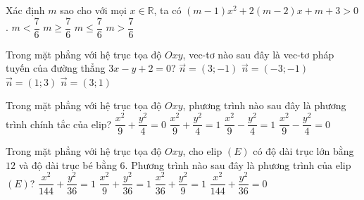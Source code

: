 \begin{ex}%
	Xác định $m$ sao cho với mọi $x\in\mathbb{R}$, ta có $(m-1)x^2+2(m-2)x+m+3>0$.
	\choice
	{$m<\dfrac{7}{6}$}
	{$m\ge\dfrac{7}{6}$}
	{$m\le\dfrac{7}{6}$}
	{\True $m>\dfrac{7}{6}$}
\end{ex}
\begin{ex}%
	Trong mặt phẳng với hệ trục tọa độ $Oxy$, vec-tơ nào sau đây là vec-tơ pháp tuyến của đường thẳng $3x-y+2=0$?
	\choice
	{\True $\overrightarrow{n}=(3;-1)$}
	{$\overrightarrow{n}=(-3;-1)$}
	{$\overrightarrow{n}=(1;3)$}
	{$\overrightarrow{n}=(3;1)$}
\end{ex}
\begin{ex}%
	Trong mặt phẳng với hệ trục tọa độ $Oxy$, phương trình nào sau đây là phương trình chính tắc của elip?
	\choice
	{$\dfrac{x^2}{9}+\dfrac{y^2}{4}=0$}	
	{\True $\dfrac{x^2}{9}+\dfrac{y^2}{4}=1$}
	{$\dfrac{x^2}{9}-\dfrac{y^2}{4}=1$}
	{$\dfrac{x^2}{9}-\dfrac{y^2}{4}=0$}
\end{ex}
\begin{ex}%
	Trong mặt phẳng với hệ trục tọa độ $Oxy$, cho elip $(E)$ có độ dài trục lớn bằng $12$ và độ dài trục bé bằng $6$. Phương trình nào sau đây là phương trình của elip $(E)$?
	\choice
	{$\dfrac{x^2}{144}+\dfrac{y^2}{36}=1$}
	{$\dfrac{x^2}{9}+\dfrac{y^2}{36}=1$}
	{\True $\dfrac{x^2}{36}+\dfrac{y^2}{9}=1$}
	{$\dfrac{x^2}{144}+\dfrac{y^2}{36}=0$}
\end{ex}
